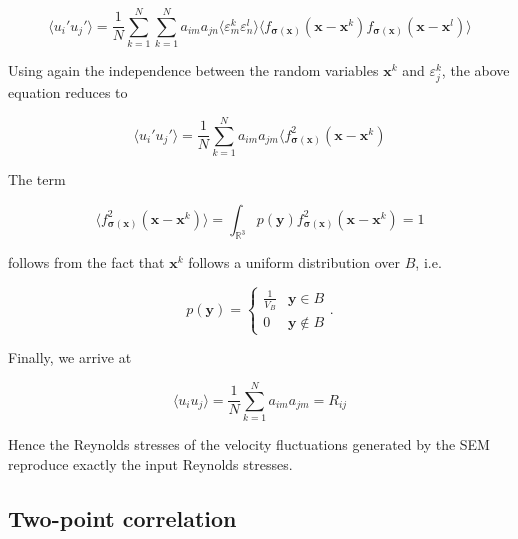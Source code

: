 \begin{equation}
\langle u_i' u_j' \rangle = \frac{1}{N}\sum_{k=1}^N\sum_{k=1}^N a_{im}a_{jn} \langle \varepsilon_m^k \varepsilon_n^l \rangle \langle f_{\boldsymbol{\sigma}(\boldsymbol{x})}(\boldsymbol{x}-\boldsymbol{x}^k) f_{\boldsymbol{\sigma}(\boldsymbol{x})}(\boldsymbol{x}-\boldsymbol{x}^l) \rangle
\end{equation}

\noindent Using again the independence between the random variables $\boldsymbol{x}^k$ and $\varepsilon_j^k$, the above equation reduces to

\begin{equation}
\langle u_i' u_j' \rangle = \frac{1}{N}\sum_{k=1}^N a_{im}a_{jm} \langle f_{\boldsymbol{\sigma}(\boldsymbol{x})}^2(\boldsymbol{x}-\boldsymbol{x}^k)
\end{equation}

\noindent The term

\begin{equation}
\langle f_{\boldsymbol{\sigma}(\boldsymbol{x})}^2(\boldsymbol{x}-\boldsymbol{x}^k) \rangle = \int_{\mathbb{R}^3} p(\boldsymbol{y}) f_{\boldsymbol{\sigma}(\boldsymbol{x})}^2(\boldsymbol{x}-\boldsymbol{x}^k) = 1
\end{equation}

\noindent follows from the fact that $\boldsymbol{x}^k$ follows a uniform distribution over $B$, i.e. 

\begin{equation} \label{distribution}
p(\boldsymbol{y}) = 
\begin{cases}
\frac{1}{V_B} & \boldsymbol{y} \in B \\
0 & \boldsymbol{y} \notin B
\end{cases}.
\end{equation}

\noindent Finally, we arrive at

\begin{equation} \label{ReynoldsStresses}
\langle u_i u_j \rangle = \frac{1}{N}\sum_{k=1}^N a_{im}a_{jm} = R_{ij}
\end{equation}

\noindent Hence the Reynolds stresses of the velocity fluctuations generated by the SEM reproduce exactly the input Reynolds stresses.

\subsection{Two-point correlation}

